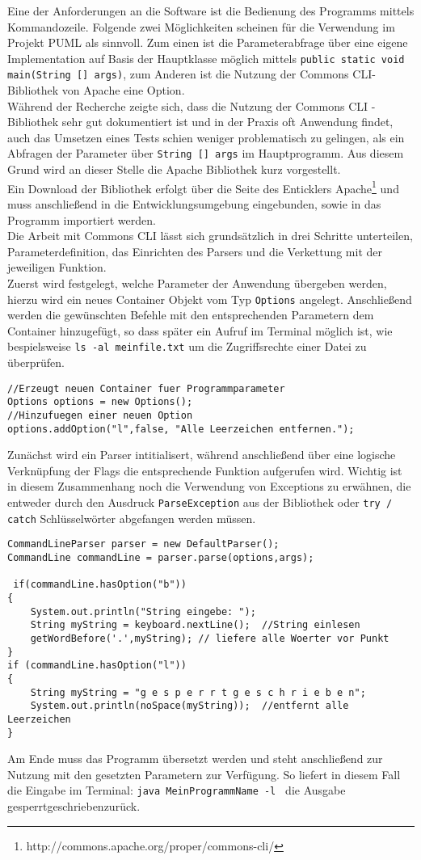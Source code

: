 Eine der Anforderungen an die Software ist die Bedienung des Programms mittels Kommandozeile. Folgende zwei Möglichkeiten scheinen für die Verwendung im Projekt PUML als sinnvoll. Zum einen ist die Parameterabfrage über eine eigene Implementation auf Basis der Hauptklasse möglich mittels \texttt{public static void main(String [] args)}, zum Anderen ist die Nutzung der \glqq Commons CLI\grqq-Bibliothek von Apache eine Option. \\
Während der Recherche zeigte sich, dass die Nutzung der Commons CLI - Bibliothek sehr gut dokumentiert ist und in der Praxis oft Anwendung findet, auch das Umsetzen eines Tests schien weniger problematisch zu gelingen, als ein Abfragen der Parameter über \texttt{String [] args} im Hauptprogramm. Aus diesem Grund wird an dieser Stelle die Apache Bibliothek kurz vorgestellt. \\
Ein Download der Bibliothek erfolgt über die Seite des Enticklers Apache\footnote[1]{http://commons.apache.org/proper/commons-cli/} und muss anschließend in die Entwicklungsumgebung eingebunden, sowie in das Programm importiert werden. \\
Die Arbeit mit Commons CLI lässt sich grundsätzlich in drei Schritte unterteilen, Parameterdefinition, das Einrichten des Parsers und die Verkettung mit der jeweiligen Funktion. \\
Zuerst wird festgelegt, welche Parameter der Anwendung übergeben werden, hierzu wird ein neues Container Objekt vom Typ \texttt{Options} angelegt. Anschließend werden die gewünschten Befehle mit den entsprechenden Parametern dem Container hinzugefügt, so dass später ein Aufruf im Terminal möglich ist, wie bespielsweise \texttt{ls -al meinfile.txt} um die Zugriffsrechte einer Datei zu überprüfen.
\begin{lstlisting}
//Erzeugt neuen Container fuer Programmparameter
Options options = new Options();
//Hinzufuegen einer neuen Option 
options.addOption("l",false, "Alle Leerzeichen entfernen.");
\end{lstlisting}
Zunächst wird ein Parser intitialisert, während anschließend über eine logische Verknüpfung der Flags die entsprechende Funktion aufgerufen wird. Wichtig ist in diesem Zusammenhang noch die Verwendung von Exceptions zu erwähnen, die entweder durch den Ausdruck \texttt{ParseException} aus der Bibliothek oder \texttt{try / catch} Schlüsselwörter abgefangen werden müssen.
\begin{lstlisting}
CommandLineParser parser = new DefaultParser();	
CommandLine commandLine = parser.parse(options,args);

 if(commandLine.hasOption("b"))
{
	System.out.println("String eingebe: ");
	String myString = keyboard.nextLine();	//String einlesen
	getWordBefore('.',myString); // liefere alle Woerter vor Punkt
}
if (commandLine.hasOption("l"))
{
	String myString = "g e s p e r r t g e s c h r i e b e n";
	System.out.println(noSpace(myString));	//entfernt alle Leerzeichen
}
\end{lstlisting}
Am Ende muss das Programm übersetzt werden und steht anschließend zur Nutzung mit den gesetzten Parametern zur Verfügung. So liefert in diesem Fall die Eingabe im Terminal: \texttt{java MeinProgrammName -l } die Ausgabe \glqq gesperrtgeschrieben\grqq zurück.
\nsecend
